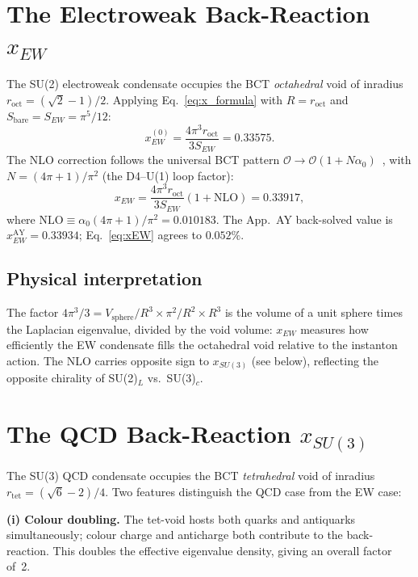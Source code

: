 \documentclass[aps,prl,twocolumn,showpacs,preprintnumbers]{revtex4-2}
\newcommand{\roct}{r_{\mathrm{oct}}}
\newcommand{\rtet}{r_{\mathrm{tet}}}
\newcommand{\azero}{\alpha_0}
\newcommand{\NLO}{\mathrm{NLO}}
\begin{document}
\section{The Electroweak Back-Reaction $x_{EW}$}

The SU(2) electroweak condensate occupies the BCT
\emph{octahedral} void of inradius $\roct = (\sqrt{2}-1)/2$.
Applying Eq.~\eqref{eq:x_formula} with $R = \roct$ and
$S_{\mathrm{bare}} = S_{EW} = \pi^5/12$:
\begin{equation}
  x_{EW}^{(0)} = \frac{4\pi^3\roct}{3S_{EW}} = 0.33575.
\end{equation}
The NLO correction follows the universal BCT pattern
$\mathcal{O} \to \mathcal{O}(1 + N\azero)$~\cite{appFE},
with $N = (4\pi+1)/\pi^2$ (the D4--U(1) loop factor):
\begin{equation}
  \boxed{x_{EW} = \frac{4\pi^3\roct}{3S_{EW}}\left(1+\NLO\right) = 0.33917,}
  \label{eq:xEW}
\end{equation}
where $\NLO \equiv \azero(4\pi+1)/\pi^2 = 0.010183$.
The App.~AY back-solved value is $x_{EW}^{\mathrm{AY}} = 0.33934$;
Eq.~\eqref{eq:xEW} agrees to $\mathbf{0.052\%}$.

\subsection*{Physical interpretation}
The factor $4\pi^3/3 = V_{\mathrm{sphere}}/R^3 \times \pi^2/R^2 \times R^3$
is the volume of a unit sphere times the Laplacian eigenvalue, divided by the 
void volume: $x_{EW}$ measures how efficiently the EW condensate fills 
the octahedral void relative to the instanton action.
The NLO carries opposite sign to $x_{SU(3)}$ (see below), reflecting 
the opposite chirality of SU(2)$_L$ vs.\ SU(3)$_c$.

\section{The QCD Back-Reaction $x_{SU(3)}$}

The SU(3) QCD condensate occupies the BCT \emph{tetrahedral} void
of inradius $\rtet = (\sqrt{6}-2)/4$. Two features distinguish the
QCD case from the EW case:

\textbf{(i) Colour doubling.}
The tet-void hosts both quarks and antiquarks simultaneously;
colour charge and anticharge both contribute to the back-reaction.
This doubles the effective eigenvalue density,
giving an overall factor of~2.
\end{document}
